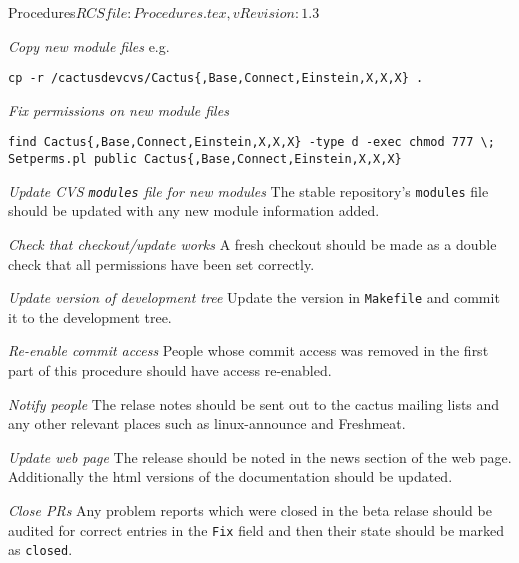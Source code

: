 \begin{cactuspart}{2}{Procedures}{$RCSfile: Procedures.tex,v $}{$Revision: 1.3 $}
\begin{Lentry}
\item[{\em Copy new module files}]
e.g.
\begin{verbatim}
cp -r /cactusdevcvs/Cactus{,Base,Connect,Einstein,X,X,X} .
\end{verbatim}
\item[{\em Fix permissions on new module files}]
\begin{verbatim}
find Cactus{,Base,Connect,Einstein,X,X,X} -type d -exec chmod 777 \;
Setperms.pl public Cactus{,Base,Connect,Einstein,X,X,X}
\end{verbatim}
\item[{\em Update CVS {\tt modules} file for new modules}]
The stable repository's {\tt modules} file should be updated with any
new module information added. 
\item[{\em Check that checkout/update works}]
A fresh checkout should be made as a double check that all permissions 
have been set correctly.
\item[{\em Update version of development tree}]
Update the version in {\tt Makefile} and commit it to the development
tree.
\item[{\em Re-enable commit access}]
People whose commit access was removed in the first part of this
procedure should have access re-enabled.
\item[{\em Notify people}]
The relase notes should be sent out to the cactus mailing lists and
any other relevant places such as linux-announce and Freshmeat.
\item[{\em Update web page}]
The release should be noted in the news section of the web page.
Additionally the html versions of the documentation should be updated.
\item[{\em Close PRs}]
Any problem reports which were closed in the beta relase should be
audited for correct entries in the {\tt Fix} field and then their
state should be marked as {\tt closed}.
\end{Lentry}


\end{cactuspart}
